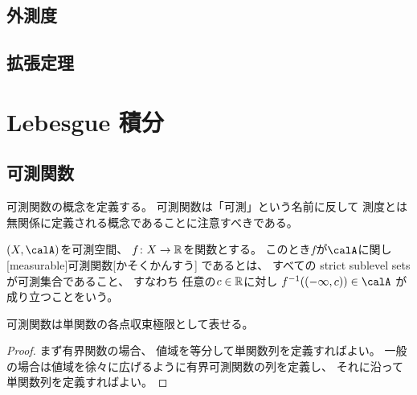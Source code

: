 \documentclass[report]{jlreq}
\begin{document}
%
\section{外測度}


%
\section{拡張定理}






%
\chapter{Lebesgue 積分}

%
\section{可測関数}

可測関数の概念を定義する。
可測関数は「可測」という名前に反して
測度とは無関係に定義される概念であることに注意すべきである。

\begin{definition}[可測関数]
    $(X, \calA)$を可測空間、
    $f \colon X \to \mathbb{R}$を関数とする。
    このとき$f$が$\calA$に関し
    [measurable]{可測関数}[かそくかんすう]
    であるとは、
    すべての strict sublevel sets が可測集合であること、
    すなわち
    任意の$c \in \mathbb{R}$に対し
    $f^{-1}((-\infty, c)) \in \calA$
    が成り立つことをいう。
\end{definition}

\begin{proposition}
    可測関数は単関数の各点収束極限として表せる。
\end{proposition}

\begin{proof}
    まず有界関数の場合、
    値域を等分して単関数列を定義すればよい。
    一般の場合は値域を徐々に広げるように有界可測関数の列を定義し、
    それに沿って単関数列を定義すればよい。
\end{proof}
\end{document}
